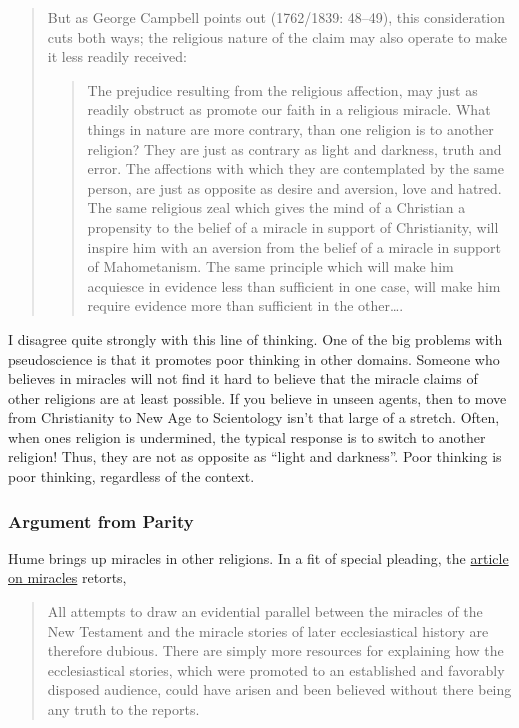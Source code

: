 \documentclass{tufte-book}
\begin{document}
\begin{quote}
But as George Campbell points out (1762/1839: 48--49), this
consideration cuts both ways; the religious nature of the claim may also
operate to make it less readily received:

\begin{quote}
The prejudice resulting from the religious affection, may just as
readily obstruct as promote our faith in a religious miracle. What
things in nature are more contrary, than one religion is to another
religion? They are just as contrary as light and darkness, truth and
error. The affections with which they are contemplated by the same
person, are just as opposite as desire and aversion, love and hatred.
The same religious zeal which gives the mind of a Christian a propensity
to the belief of a miracle in support of Christianity, will inspire him
with an aversion from the belief of a miracle in support of
Mahometanism. The same principle which will make him acquiesce in
evidence less than sufficient in one case, will make him require
evidence more than sufficient in the other\ldots{}.
\end{quote}
\end{quote}

I disagree quite strongly with this line of thinking. One of the big
problems with pseudoscience is that it promotes poor thinking in other
domains. Someone who believes in miracles will not find it hard to
believe that the miracle claims of other religions are at least
possible. If you believe in unseen agents, then to move from
Christianity to New Age to Scientology isn't that large of a stretch.
Often, when ones religion is undermined, the typical response is to
switch to another religion! Thus, they are not as opposite as ``light
and darkness''. Poor thinking is poor thinking, regardless of the
context.

\subsubsection{Argument from Parity}\label{argument-from-parity}

Hume brings up miracles in other religions. In a fit of special
pleading, the \href{http://plato.stanford.edu/entries/miracles/}{article
on miracles} retorts,

\begin{quote}
All attempts to draw an evidential parallel between the miracles of the
New Testament and the miracle stories of later ecclesiastical history
are therefore dubious. There are simply more resources for explaining
how the ecclesiastical stories, which were promoted to an established
and favorably disposed audience, could have arisen and been believed
without there being any truth to the reports.
\end{quote}
\end{document}
